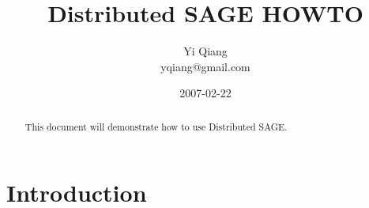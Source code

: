 \documentclass[]{howto}
\title{Distributed SAGE HOWTO}
\author{
    Yi Qiang\\
    yqiang@gmail.com
}
\date{2007-02-22}
\begin{document}
\maketitle

\begin{abstract}
    This document will demonstrate how to use Distributed SAGE.
\end{abstract}

\section{Introduction}
            
\end{document}

